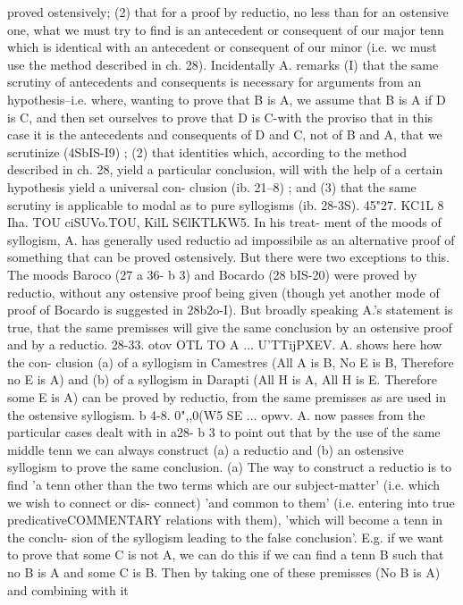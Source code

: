 {{{{{{{{{{{{{{{{{{{{{{proved ostensively; (2) that for a proof by reductio, no less than
for an ostensive one, what we must try to find is an antecedent
or consequent of our major tenn which is identical with an
antecedent or consequent of our minor (i.e. wc must use the
method described in ch. 28). Incidentally A. remarks (I) that
the same scrutiny of antecedents and consequents is necessary
for arguments from an hypothesis--i.e. where, wanting to prove
that B is A, we assume that B is A if D is C, and then set
ourselves to prove that D is C-with the proviso that in this case
it is the antecedents and consequents of D and C, not of B and A,
that we scrutinize (4SbIS-I9) ; (2) that identities which, according
to the method described in ch. 28, yield a particular conclusion,
will with the help of a certain hypothesis yield a universal con-
clusion (ib. 21--8) ; and (3) that the same scrutiny is applicable to
modal as to pure syllogisms (ib. 28-3S).
45"27. KC1L 8 Iha. TOU ciSUVo.TOU, KilL S€lKTLKW5. In his treat-
ment of the moods of syllogism, A. has generally used reductio ad
impossibile as an alternative proof of something that can be
proved ostensively. But there were two exceptions to this. The
moods Baroco (27 a 36- b 3) and Bocardo (28 bIS-20) were proved by
reductio, without any ostensive proof being given (though yet
another mode of proof of Bocardo is suggested in 28b2o-I). But
broadly speaking A.'s statement is true, that the same premisses
will give the same conclusion by an ostensive proof and by a
reductio.
28-33. otov OTL TO A ... U'TTijPXEV. A. shows here how the con-
clusion (a) of a syllogism in Camestres (All A is B, No E is B,
Therefore no E is A) and (b) of a syllogism in Darapti (All H is A,
All H is E. Therefore some E is A) can be proved by reductio, from
the same premisses as are used in the ostensive syllogism.
b 4-8. 0",,0(W5 SE ... opwv. A. now passes from the particular
cases dealt with in a28- b 3 to point out that by the use of the same
middle tenn we can always construct (a) a reductio and (b) an
ostensive syllogism to prove the same conclusion. (a) The way to
construct a reductio is to find 'a tenn other than the two terms
which are our subject-matter' (i.e. which we wish to connect or dis-
connect) 'and common to them' (i.e. entering into true predicativeCOMMENTARY
relations with them), 'which will become a tenn in the conclu-
sion of the syllogism leading to the false conclusion'. E.g. if
we want to prove that some C is not A, we can do this if we can
find a tenn B such that no B is A and some C is B. Then by
taking one of these premisses (No B is A) and combining with it
}}}}}}}}}}}}}}}}}}}}}}
